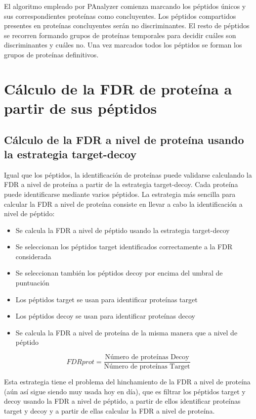 El algoritmo empleado por PAnalyzer comienza marcando los péptidos únicos y sus correspondientes proteínas como concluyentes. Los péptidos compartidos presentes en proteínas concluyentes serán no discriminantes. El resto de péptidos se recorren formando grupos de proteínas temporales para decidir cuáles son discriminantes y cuáles no. Una vez marcados todos los péptidos se forman los grupos de proteínas definitivos.

\section{Cálculo de la FDR de proteína a partir de sus péptidos}
\subsection{Cálculo de la FDR a nivel de proteína usando la estrategia target-decoy}
Igual que los péptidos, la identificación de proteínas puede validarse calculando la FDR a nivel de proteína a partir de la estrategia target-decoy. Cada proteína puede identificarse mediante varios péptidos. La estrategia más sencilla para calcular la FDR a nivel de proteína consiste en llevar a cabo la identificación a nivel de péptido:
\begin{itemize}
\item Se calcula la FDR a nivel de péptido usando la estrategia target-decoy
\item Se seleccionan los péptidos target identificados correctamente a la FDR considerada
\item Se seleccionan también los péptidos decoy por encima del umbral de puntuación
\item Los péptidos target se usan para identificar proteínas target
\item Los péptidos decoy se usan para identificar proteínas decoy
\item Se calcula la FDR a nivel de proteína de la misma manera que a nivel de péptido
\end{itemize}

$$FDRprot = \frac{\text{Número de proteínas Decoy}}{\text{Número de proteínas Target}}$$

Esta estrategia tiene el problema del hinchamiento de la FDR a nivel de proteína (aún así sigue siendo muy usada hoy en día), que es filtrar los péptidos target y decoy usando la FDR a nivel de péptido, a partir de ellos identificar proteínas target y decoy y a partir de ellas calcular la FDR a nivel de proteína.

